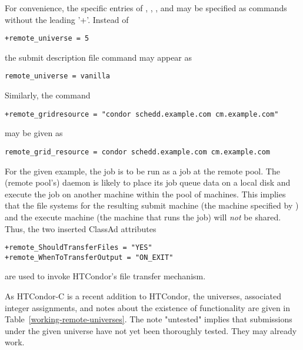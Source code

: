 For convenience, the specific entries of 
, 
, 
, and
may be specified as  commands
without the leading '+'. 
Instead of 
\footnotesize
\begin{verbatim}
+remote_universe = 5
\end{verbatim}
\normalsize

the submit description file command may appear as

\footnotesize
\begin{verbatim}
remote_universe = vanilla
\end{verbatim}
\normalsize

Similarly, the command
\footnotesize
\begin{verbatim}
+remote_gridresource = "condor schedd.example.com cm.example.com"
\end{verbatim}
\normalsize

may be given as

\footnotesize
\begin{verbatim}
remote_grid_resource = condor schedd.example.com cm.example.com
\end{verbatim}
\normalsize

For the given example,
the job is to be run as a  
 job at the remote pool.
The (remote pool's)  daemon is likely to
place its job queue data on a local disk 
and execute the job on another machine within the pool of machines.
This implies that the file systems for the resulting submit machine
(the machine specified by ) and
the execute machine (the machine that runs the job) will
\emph{not} be shared.
Thus,
the two inserted ClassAd attributes
\footnotesize
\begin{verbatim}
+remote_ShouldTransferFiles = "YES"
+remote_WhenToTransferOutput = "ON_EXIT"
\end{verbatim}
\normalsize
are used to invoke HTCondor's file transfer mechanism. 



As HTCondor-C is a recent addition to HTCondor,
the universes, associated integer assignments,
and notes about the existence of functionality are given in 
Table~\ref{working-remote-universes}.
The note "untested" implies that
submissions under the given universe have not yet
been thoroughly tested.
They may already work.

